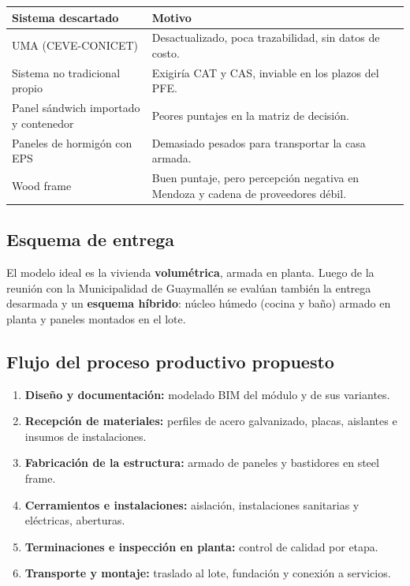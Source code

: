 \documentclass[11pt,a4paper]{article}
\begin{document}
\begin{center}
\small
\begin{tabularx}{\linewidth}{lX}
\toprule
\textbf{Sistema descartado} & \textbf{Motivo} \\
\midrule
UMA (CEVE-CONICET) & Desactualizado, poca trazabilidad, sin datos de costo. \\
Sistema no tradicional propio & Exigiría CAT y CAS, inviable en los plazos del PFE. \\
Panel sándwich importado y contenedor & Peores puntajes en la matriz de decisión. \\
Paneles de hormigón con EPS & Demasiado pesados para transportar la casa armada. \\
Wood frame & Buen puntaje, pero percepción negativa en Mendoza y cadena de proveedores débil. \\
\bottomrule
\end{tabularx}
\end{center}

\subsection{Esquema de entrega}
El modelo ideal es la vivienda \textbf{volumétrica}, armada en planta. Luego de la reunión con la Municipalidad de Guaymallén se evalúan también la entrega desarmada y un \textbf{esquema híbrido}: núcleo húmedo (cocina y baño) armado en planta y paneles montados en el lote.

\subsection{Flujo del proceso productivo propuesto}
\begin{enumerate}
  \item \textbf{Diseño y documentación:} modelado BIM del módulo y de sus variantes.
  \item \textbf{Recepción de materiales:} perfiles de acero galvanizado, placas, aislantes e insumos de instalaciones.
  \item \textbf{Fabricación de la estructura:} armado de paneles y bastidores en steel frame.
  \item \textbf{Cerramientos e instalaciones:} aislación, instalaciones sanitarias y eléctricas, aberturas.
  \item \textbf{Terminaciones e inspección en planta:} control de calidad por etapa.
  \item \textbf{Transporte y montaje:} traslado al lote, fundación y conexión a servicios.
\end{enumerate}
\end{document}
